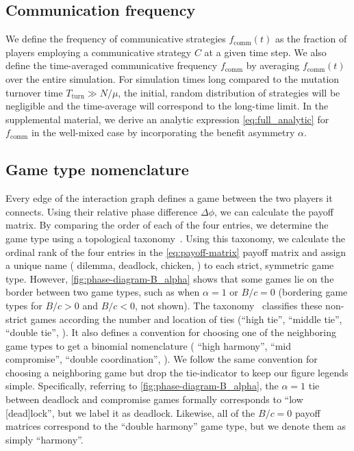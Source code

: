 \documentclass[pdflatex,lineno,referee,sn-nature]{sn-jnl}
\begin{document}
\subsection{Communication frequency}
We define the frequency of communicative strategies
$f_{\text{comm}}(t)$ as the fraction of players employing
a communicative strategy $C$ at a given time step.
We also define the time-averaged communicative frequency
$f_{\text{comm}}$
by averaging $f_{\text{comm}}(t)$ over the entire simulation.
For simulation times long compared to the mutation turnover time
$T_{\text{turn}} \gg N/\mu$,
the initial, random distribution of strategies will be negligible
and the time-average will correspond to the long-time limit.
In the supplemental material,
we derive an analytic expression \cref{eq:full_analytic} for
$f_{\text{comm}}$ in the well-mixed case
by incorporating the benefit asymmetry $\alpha$.

\subsection{Game type nomenclature}
Every edge of the interaction graph
defines a game between the two players it connects.
Using their relative phase difference $\Delta \phi$,
we can calculate the payoff matrix.
By comparing the order of each of the four entries,
we determine the game type using
a topological taxonomy~\citep{bruns2015names}.
Using this taxonomy, we calculate the ordinal rank of the four entries
in the \cref{eq:payoff-matrix} payoff matrix
and assign a unique name (\eg{} dilemma, deadlock, chicken, \etc{})
to each strict, symmetric game type.
However, \cref{fig:phase-diagram-B_alpha}
shows that some games lie on the border between two game types,
such as when $\alpha = 1$ or $B/c = 0$
(bordering game types for $B/c > 0$ and $B/c < 0$, not shown).
The taxonomy~\citep{bruns2015names} classifies these non-strict games
according the number and location of ties (``high tie'', ``middle tie'',
``double tie'', \etc{}).
It also defines a convention for choosing one of the neighboring game types
to get a binomial nomenclature (\eg{} ``high harmony'', ``mid compromise'',
``double coordination'', \etc{}).
We follow the same convention for choosing a neighboring game
but drop the tie-indicator to keep our figure legends simple.
Specifically, referring to \cref{fig:phase-diagram-B_alpha},
the $\alpha = 1$ tie between deadlock and compromise games
formally corresponds to ``low [dead]lock'',
but we label it as deadlock.
Likewise, all of the $B/c = 0$ payoff matrices
correspond to the ``double harmony'' game type,
but we denote them as simply ``harmony''.
\end{document}
